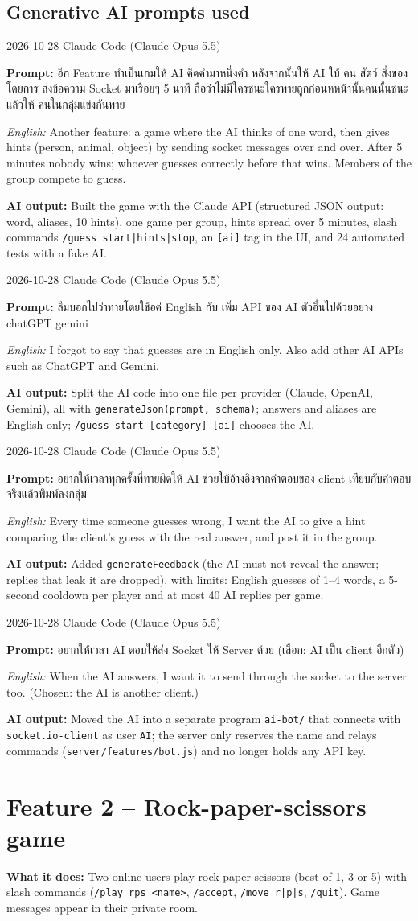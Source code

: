 \documentclass[11pt,a4paper]{article}
\newcommand{\code}[1]{\texttt{#1}}
\newcommand{\req}[1]{\begin{tcolorbox}[colback=accent!6,colframe=accent!60,boxrule=0.5pt,left=4pt,right=4pt,top=2pt,bottom=2pt]\textbf{What it does:} #1\end{tcolorbox}}
\newcommand{\promptbox}[4]{%
\begin{tcolorbox}[colback=codebg,colframe=gray!50,boxrule=0.4pt,left=4pt,right=4pt,top=2pt,bottom=2pt]
{\small #1 \quad Claude Code (Claude Opus 5.5)}\par
\textbf{Prompt:} #2\par
\textit{English:} #3\par
\textbf{AI output:} #4
\end{tcolorbox}}
\begin{document}
\subsection*{Generative AI prompts used}
\promptbox{2026-10-28}{อีก Feature ทำเป็นเกมให้ AI คิดคำมาหนึ่งคำ หลังจากนั้นให้ AI ใบ้ คน สัตว์ สิ่งของ โดยการ ส่งข้อความ Socket มาเรื่อยๆ 5 นาที ถือว่าไม่มีใครชนะใครทายถูกก่อนหหน้านั้นคนนั้นชนะ แล้วให้ คนในกลุ่มแข่งกันทาย}{Another feature: a game where the AI thinks of one word, then gives hints (person, animal, object) by sending socket messages over and over. After 5 minutes nobody wins; whoever guesses correctly before that wins. Members of the group compete to guess.}{Built the game with the Claude API (structured JSON output: word, aliases, 10 hints), one game per group, hints spread over 5 minutes, slash commands \code{/guess start|hints|stop}, an \code{[ai]} tag in the UI, and 24 automated tests with a fake AI.}
\promptbox{2026-10-28}{ลืมบอกไปว่าทายโดยใช้อค่ English กับ เพิ่ม API ของ AI ตัวอื่นไปด้วยอย่าง chatGPT gemini}{I forgot to say that guesses are in English only. Also add other AI APIs such as ChatGPT and Gemini.}{Split the AI code into one file per provider (Claude, OpenAI, Gemini), all with \code{generateJson(prompt, schema)}; answers and aliases are English only; \code{/guess start [category] [ai]} chooses the AI.}
\promptbox{2026-10-28}{อยากให้เวลาทุกครั้งที่ทายผิดให้ AI ช่วยใบ้อ้างอิงจากคำตอบของ client เทียบกับคำตอบจริงแล้วพิมพ์ลงกลุ่ม}{Every time someone guesses wrong, I want the AI to give a hint comparing the client's guess with the real answer, and post it in the group.}{Added \code{generateFeedback} (the AI must not reveal the answer; replies that leak it are dropped), with limits: English guesses of 1--4 words, a 5-second cooldown per player and at most 40 AI replies per game.}
\promptbox{2026-10-28}{อยากให้เวลา AI ตอบให้ส่ง Socket ให้ Server ด้วย \newline (เลือก: AI เป็น client อีกตัว)}{When the AI answers, I want it to send through the socket to the server too. (Chosen: the AI is another client.)}{Moved the AI into a separate program \code{ai-bot/} that connects with \code{socket.io-client} as user \code{AI}; the server only reserves the name and relays commands (\code{server/features/bot.js}) and no longer holds any API key.}

\clearpage
\section{Feature 2 -- Rock-paper-scissors game}
\req{Two online users play rock-paper-scissors (best of 1, 3 or 5) with slash commands
(\code{/play rps <name>}, \code{/accept}, \code{/move r|p|s}, \code{/quit}). Game messages appear in their
private room.}
\end{document}
